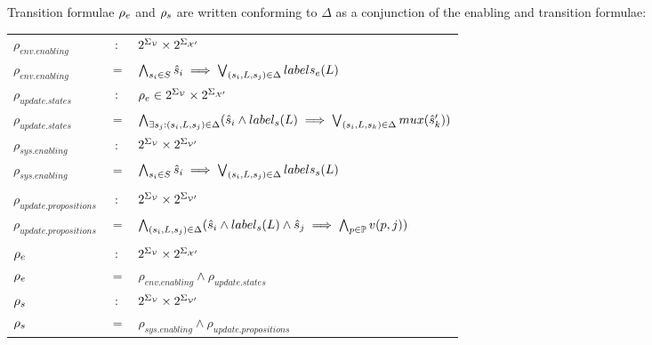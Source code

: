 Transition formulae ${\rho_e}$ and ${\rho_s}$ are written conforming to $\Delta$ as a conjunction of the enabling and transition formulae:

\vspace{1em}
\begin{tabular}{ l c l }
	$\rho_{env.enabling}$&$:$&$2^{\Sigma_{{\mathcal{V}}}} \times 2^{\Sigma_{{\mathcal{X}}'}}$\\
	$\rho_{env.enabling}$ &$=$& $\bigwedge_{s_i \in S} \hat{s}_{i} \implies \bigvee_{(s_i,L,s_j) \in \Delta}labels_e(L)$\\
	$\rho_{update.states}$&$:$&${\rho_e}  \in 2^{\Sigma_{{\mathcal{V}}}} \times 2^{\Sigma_{{\mathcal{X}}'}}$\\
	$\rho_{update.states}$&$=$&$\bigwedge_{\exists s_j:(s_i,L,s_j) \in \Delta} (\hat{s}_{i} \wedge label_s(L) \implies \bigvee_{(s_i,L,s_k) \in \Delta}mux(\hat{s}_{k}') ) $\\	
	$\rho_{sys.enabling}$&$:$&$2^{\Sigma_{{\mathcal{V}}}} \times 2^{\Sigma_{{\mathcal{V}}'}}$\\
	$\rho_{sys.enabling}$ &$=$& $\bigwedge_{s_i \in S} \hat{s}_{i} \implies \bigvee_{(s_i,L,s_j) \in \Delta}labels_s(L)$\\
	&&\\
	$\rho_{update.propositions}$&$:$&$2^{\Sigma_{{\mathcal{V}}}} \times 2^{\Sigma_{{\mathcal{V}}'}}$\\
	$\rho_{update.propositions}$&$=$&$\bigwedge_{(s_i,L,s_j) \in \Delta} (\hat{s}_{i} \wedge label_s(L) \wedge \hat{s}_{j} \implies \bigwedge_{p \in \mathbb{P}}v(p,j) )$\\
	&&\\
	${\rho_e}$&$:$&$2^{\Sigma_{{\mathcal{V}}}} \times 2^{\Sigma_{{\mathcal{X}}'}}$\\
	${\rho_e}$&$=$&$\rho_{env.enabling} \wedge  \rho_{update.states}$\\		
	${\rho_s}$&$:$&$2^{\Sigma_{{\mathcal{V}}}} \times 2^{\Sigma_{{\mathcal{V}}'}}$\\	
	${\rho_s}$&$=$&$\rho_{sys.enabling} \wedge  \rho_{update.propositions}$\\	
\end{tabular}
\vspace{1em}

